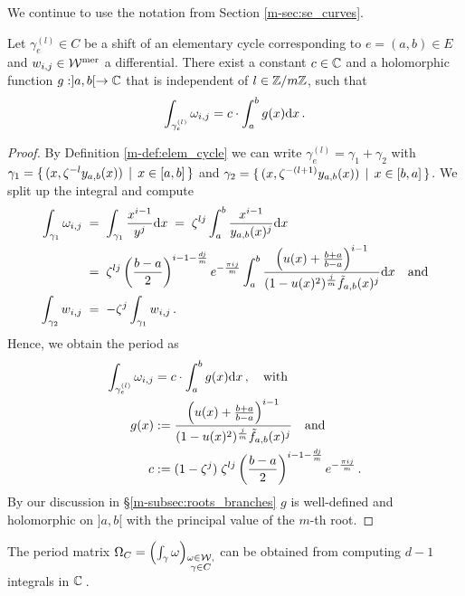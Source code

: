 \documentclass[main.tex]{subfiles}
\begin{document}
  We continue to use the notation from Section \ref{m-sec:se_curves}. 
  
  \begin{thm}\label{thm:periods}
   Let $\gamma_e^{(l)} \in C$ be a shift of an elementary cycle corresponding to $e = (a,b) \in E$ and $w_{i,j} \in \mathcal{W}^{\text{mer}}$ a differential. There exist a constant $c \in \mathbb{C}$ 
   and a holomorphic function $g:]a,b[ \rightarrow \mathbb{C}$
   that is independent of $l \in \mathbb{Z}/m\mathbb{Z}$, such that
   \begin{align}
    \int_{\gamma_e^{(l)}} \omega_{i,j} = c \cdot \int_a^b g(x)\mathrm d x\,.
   \end{align}

  \end{thm}
  \begin{proof}
    By Definition \ref{m-def:elem_cycle} we can write $\gamma_e^{(l)} = \gamma_1 + \gamma_2$ with $\gamma_1 = \{ \, (x,\zeta^{-l}y_{a,b}(x)) \, \mid \, x \in [a,b] \, \}$ and
    $\gamma_2 = \{ \, (x,\zeta^{-(l+1)}y_{a,b}(x)) \, \mid \, x \in [b,a] \, \}$. We split up the integral and compute
    \begin{align}\label{eq:thm_periods_1}
     \int_{\gamma_1} \omega_{i,j} \; & = \; \int_{\gamma_1} \frac{x^{i-1}}{y^j} \mathrm d x \; = \; \zeta^{lj} \int_a^b \frac{x^{i-1}}{y_{a,b}(x)^j} \mathrm d x \\ \; & = \; 
     \zeta^{lj} \left(\frac{b-a}{2}\right)^{i-1-\frac{dj}{m}} e^{-\frac{\pi i j}{m}} 
     \int_a^b \frac{\left(u(x)+\frac{b+a}{b-a}\right)^{i-1}}{(1-u(x)^2)^{\frac{j}{m}}\tilde{f}_{a,b}(x)^j} \mathrm d x \quad \text{and} \\
    \int_{\gamma_2} w_{i,j} \; & = \; - \zeta^j \int_{\gamma_1} w_{i,j}\,.
  \end{align}
  Hence, we obtain the period as
  \begin{align}
   \int_{\gamma_e^{(l)}} \omega_{i,j} & =  c \cdot \int_a^b g(x)\mathrm d x\,, \quad \text{with} \\
   g(x) & := \frac{\left(u(x)+\frac{b+a}{b-a}\right)^{i-1}}{(1-u(x)^2)^{\frac{j}{m}}\tilde{f}_{a,b}(x)^j} \quad \text{and} \\
      c & := (1-\zeta^j) \; \zeta^{lj} \left(\frac{b-a}{2}\right)^{i-1-\frac{dj}{m}} e^{-\frac{\pi i j}{m}}\,.
  \end{align}
  By our discussion in \S \ref{m-subsec:roots_branches} $g$ is well-defined and holomorphic on $]a,b[$ with the principal value of the $m$-th root.
  \end{proof}
  
  \begin{coro}
   The period matrix $\Omega_C = \left( \int_{\gamma} \omega \right)_{\substack{\omega \in \mathcal{W}, \\ \gamma \in C}}$ can be obtained from computing $d-1$ integrals in $\mathbb{C}$\,. 
  \end{coro}
\end{document}
